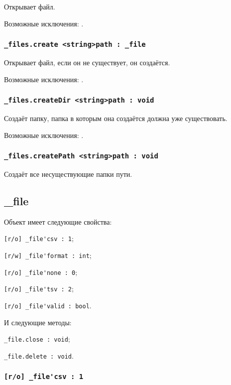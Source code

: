 Открывает файл.

Возможные исключения: .

\subsubsection{\lstinline|_files.create <string>path : _file|}

Открывает файл, если он не существует, он создаётся.

Возможные исключения: .

\subsubsection{\lstinline|_files.createDir <string>path : void|}

Создаёт папку, папка в которым она создаётся должна уже существовать.

Возможные исключения: .

\subsubsection{\lstinline|_files.createPath <string>path : void|}

Создаёт все несуществующие папки пути.

\subsection{{\color{orange} \_file}}

Объект \file{} имеет следующие свойства:
\begin{icItems}
	\item \lstinline|[r/o] _file'csv : 1|;
	\item \lstinline|[r/w] _file'format : int|;
	\item \lstinline|[r/o] _file'none : 0|;
	\item \lstinline|[r/o] _file'tsv : 2|;
	\item \lstinline|[r/o] _file'valid : bool|.
\end{icItems}

И следующие методы:
\begin{icItems}
	\item \lstinline|_file.close : void|;
	\item \lstinline|_file.delete : void|.
\end{icItems}

\subsubsection{\lstinline|[r/o] _file'csv : 1|}

